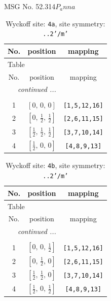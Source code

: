 \documentclass[fleqn,8pt]{jsarticle}
\begin{document}
\setcounter{MaxMatrixCols}{32}

\renewcommand{\tablename}{Table~}
\renewcommand{\figurename}{Figure~}
\begin{center}
\LARGE
MSG No. 52.314\quad$P_{a}nna$
\end{center}
\renewcommand{\arraystretch}{1.2}
\begin{longtable}{ccc}
\caption{Wyckoff site: {\tt 4a}, site symmetry: {\tt ..2'/m'}}
 \\
 \hline \hline
No. & position & mapping \\ \hline \endfirsthead

\multicolumn{2}{l}{\tablename\ \thetable{}} \\
 \hline \hline
No. & position & mapping \\ \hline \endhead

 \hline \hline
\multicolumn{2}{r}{\footnotesize\it continued ...} \\ \endfoot

 \hline \hline
\multicolumn{2}{r}{} \\ \endlastfoot

1 & $\left[ 0,\, 0,\, 0 \right]$ & {\tt [1,5,12,16]} \\ \hline
2 & $\left[ 0,\, \frac{1}{2},\, \frac{1}{2} \right]$ & {\tt [2,6,11,15]} \\ \hline
3 & $\left[ \frac{1}{2},\, \frac{1}{2},\, \frac{1}{2} \right]$ & {\tt [3,7,10,14]} \\ \hline
4 & $\left[ \frac{1}{2},\, 0,\, 0 \right]$ & {\tt [4,8,9,13]} \\
\end{longtable}
\renewcommand{\arraystretch}{1.2}
\begin{longtable}{ccc}
\caption{Wyckoff site: {\tt 4b}, site symmetry: {\tt ..2'/m'}}
 \\
 \hline \hline
No. & position & mapping \\ \hline \endfirsthead

\multicolumn{2}{l}{\tablename\ \thetable{}} \\
 \hline \hline
No. & position & mapping \\ \hline \endhead

 \hline \hline
\multicolumn{2}{r}{\footnotesize\it continued ...} \\ \endfoot

 \hline \hline
\multicolumn{2}{r}{} \\ \endlastfoot

1 & $\left[ 0,\, 0,\, \frac{1}{2} \right]$ & {\tt [1,5,12,16]} \\ \hline
2 & $\left[ 0,\, \frac{1}{2},\, 0 \right]$ & {\tt [2,6,11,15]} \\ \hline
3 & $\left[ \frac{1}{2},\, \frac{1}{2},\, 0 \right]$ & {\tt [3,7,10,14]} \\ \hline
4 & $\left[ \frac{1}{2},\, 0,\, \frac{1}{2} \right]$ & {\tt [4,8,9,13]} \\
\end{longtable}
\end{document}
